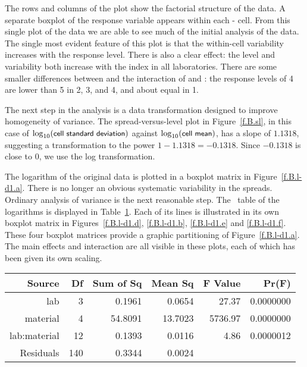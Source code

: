 The rows and columns of the plot show the factorial structure of the
data.  A separate boxplot of the response variable appears within each
- cell. From this single plot of the data we are
able to see much of the initial 
analysis of the data.  The single most evident feature of this plot is that
the within-cell variability increases with the response level.	There is also a
clear  effect: the level and variability both increase with the
 index in all laboratories.  There are some smaller differences
between  and the interaction of  and : the response
levels of  4 are lower than  5 in  2, 3, and 4,
and about equal in  1.


The next step in the analysis is a data transformation designed to improve
homogeneity of variance.  The spread-versus-level plot in Figure~\ref{f.B.sl},
in this case of $\log_{10}(\mbox{{\protect\small\sf cell standard deviation}})$ against
$\log_{10}(\mbox{{\protect\small\sf cell mean}})$, has a slope of $1.1318$,
suggesting a transformation to the power $1-1.1318 = -0.1318$.
Since $-0.1318$ is close to $0$, we use the log transformation.

The logarithm of the original data is plotted in a boxplot matrix in
Figure~\ref{f.B.l-d1.a}. There is no longer an obvious
systematic variability in the spreads.	 Ordinary analysis of variance is the
next reasonable step.	 The \ANOVA\ table of the logarithms is
displayed in Table~\ref{t.B.l-anova}.  Each of its lines
is illustrated in its own boxplot matrix in
Figures~\ref{f.B.l-d1.d}, \ref{f.B.l-d1.b}, \ref{f.B.l-d1.e} and
\ref{f.B.l-d1.f}.
These four boxplot matrices provide a graphic partitioning of
Figure~\ref{f.B.l-d1.a}.
The main effects and interaction are all visible in these plots,
each of which has been given its own scaling.

\begin{table}[tbp]
\label{t.B.l-anova}
\small\sf

\begin{center}
\begin{tabular}{rrrrrr}
\hline
      Source& Df&Sum of Sq&Mean Sq&F Value&    Pr(F)\\
\hline
	 lab&  3&   0.1961& 0.0654&  27.37&0.0000000\\
    material&  4&  54.8091&13.7023&5736.97&0.0000000\\
lab:material& 12&   0.1393& 0.0116&   4.86&0.0000012\\
   Residuals&140&   0.3344& 0.0024&	  &	    \\
\hline
\end{tabular}
\end{center}
\end{table}


